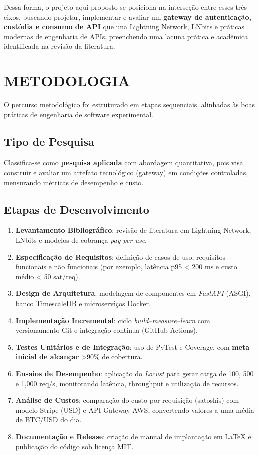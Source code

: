 \documentclass[openright]{normas-utf-tex}
\begin{document}
Dessa forma, o projeto aqui proposto se posiciona na interseção entre esses três eixos, buscando projetar, implementar e avaliar um \textbf{gateway de autenticação, custódia e consumo de API} que una Lightning Network, LNbits e práticas modernas de engenharia de APIs, preenchendo uma lacuna prática e acadêmica identificada na revisão da literatura.

\chapter{METODOLOGIA}

O percurso metodológico foi estruturado em etapas sequenciais, alinhadas às boas práticas de engenharia de software experimental.

\section{Tipo de Pesquisa}
Classifica-se como \textbf{pesquisa aplicada} com abordagem quantitativa, pois visa construir e avaliar um artefato tecnológico (gateway) em condições controladas, mensurando métricas de desempenho e custo.

\section{Etapas de Desenvolvimento}
\begin{enumerate}
    \item \textbf{Levantamento Bibliográfico}: revisão de literatura em Lightning Network, LNbits e modelos de cobrança \textit{pay-per-use}. 
    \item \textbf{Especificação de Requisitos}: definição de casos de uso, requisitos funcionais e não funcionais (por exemplo, latência p95 < 200 ms e custo médio < 50 sat/req).
    \item \textbf{Design de Arquitetura}: modelagem de componentes em \textit{FastAPI} (ASGI), banco TimescaleDB e microserviços Docker. 
    \item \textbf{Implementação Incremental}: ciclo \textit{build--measure--learn} com versionamento Git e integração contínua (GitHub Actions). 
    \item \textbf{Testes Unitários e de Integração}: uso de PyTest e Coverage, com \textbf{meta inicial de alcançar} >90\% de cobertura.
    \item \textbf{Ensaios de Desempenho}: aplicação do \textit{Locust} para gerar carga de 100, 500 e 1,000 req/s, monitorando latência, throughput e utilização de recursos. 
    \item \textbf{Análise de Custos}: comparação do custo por requisição (satoshis) com modelo Stripe (USD) e API Gateway AWS, convertendo valores a uma média de BTC/USD do dia. 
    \item \textbf{Documentação e Release}: criação de manual de implantação em LaTeX e publicação do código sob licença MIT.
\end{enumerate}
\end{document}
